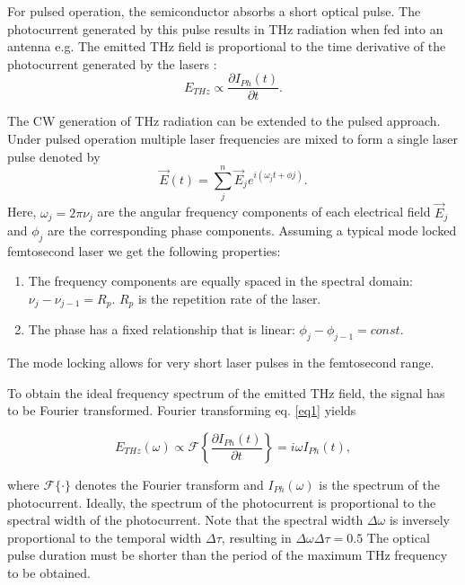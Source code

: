 For pulsed operation, the semiconductor absorbs a short optical pulse. The photocurrent generated by this pulse results in THz radiation when fed into an antenna e.g. The emitted THz field is proportional to the time derivative of the photocurrent generated by the lasers \cite{preuTunableContinuouswaveTerahertz2011}:
\begin{equation}
	E_{THz} \propto \frac{\partial I_{Ph}(t)}{\partial t}.
\label{eq1}
\end{equation}

The CW generation of THz radiation can be extended to the pulsed approach. Under pulsed operation multiple laser frequencies are mixed to form a single laser pulse denoted by 
\begin{equation}
	\vec{E}(t) = \sum_j^n \vec{E}_je^{i(\omega_j t + \phi j)}.
\label{eq3}
\end{equation}
Here, $\omega_j = 2 \pi \nu_j$ are the angular frequency components of each electrical field $\vec{E}_j$ and $\phi_j$ are the corresponding phase components. Assuming a typical mode locked femtosecond laser we get the following properties: 
\renewcommand{\labelenumi}{\alph{enumi})}
\begin{enumerate}
	\item The frequency components are equally spaced in the spectral domain: $\nu_j - \nu_{j-1} = R_p$. $R_p$ is the repetition rate of the laser.
	\item The phase has a fixed relationship that is linear: $\phi_j - \phi_{j-1} = const.$
\end{enumerate}

The mode locking allows for very short laser pulses in the femtosecond range.

To obtain the ideal frequency spectrum of the emitted THz field, the signal has to be Fourier transformed. Fourier transforming eq. \eqref{eq1} yields

\begin{equation}
	E_{THz}(\omega) \propto \mathcal{F}\left\{ \frac{\partial I_{Ph}(t)}{\partial t} \right\} = i\omega I_{Ph}(t), 
\end{equation}

where $\mathcal{F}\{\cdot \}$ denotes the Fourier transform and $I_{Ph}(\omega)$ is the spectrum of the photocurrent. Ideally, the spectrum of the photocurrent is proportional to the spectral width of the photocurrent. Note that the spectral width $\Delta \omega$ is inversely proportional to the temporal width $\Delta \tau$, resulting in $\Delta \omega \Delta \tau = 0.5$ The optical pulse duration must be shorter than the period of the maximum THz frequency to be obtained. 

